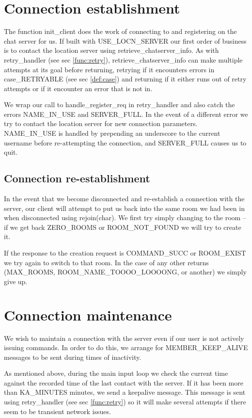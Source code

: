 \documentclass{article}
\begin{document}
\section{Connection establishment}
The function init\_client does the work of connecting to and registering
on the chat server for us.
If built with USE\_LOCN\_SERVER our first order of business is to contact
the location server using retrieve\_chatserver\_info. As with 
retry\_handler (see sec \ref{func:retry}), retrieve\_chatserver\_info can
make multiple attempts
at its goal before returning, retrying if it encounters errors in
case\_RETRYABLE (see sec \ref{def:case}) and returning if it either runs
out of retry attempts or if it encounter an error that is not in.

We wrap our call to handle\_register\_req in retry\_handler and also
catch the errors NAME\_IN\_USE and SERVER\_FULL. In the event of a different
error we try to contact the location server for new connection parameters.
NAME\_IN\_USE is handled by prepending an underscore to the current username
before re-attempting the connection, and SERVER\_FULL causes us to quit.

\subsection{Connection re-establishment}
In the event that we become disconnected and re-establish a connection with
the server, our client will attempt to put us back into the same room we had
been in when disconnected using rejoin(char). We first try simply changing to
the room -- if we get back ZERO\_ROOMS or ROOM\_NOT\_FOUND we will try to
create it.

If the response to the creation request is COMMAND\_SUCC or ROOM\_EXIST we
try again to switch to that room. In the case of any other returns
(MAX\_ROOMS, ROOM\_NAME\_TOOOO\_LOOOONG, or another) we simply give up.

\section{Connection maintenance}
We wish to maintain a connection with the server even if our user is not
actively issuing commands. In order to do this, we arrange for 
MEMBER\_KEEP\_ALIVE messages to be sent during times of inactivity.

As mentioned above, during the main input loop we check the current time
against the recorded time of the last contact with the server. If it has
been more than KA\_MINUTES minutes, we send a keepalive message. This message
is sent using retry\_handler (see sec \ref{func:retry}) so it will make
several attempts if there seem to be transient network issues.
\end{document}
